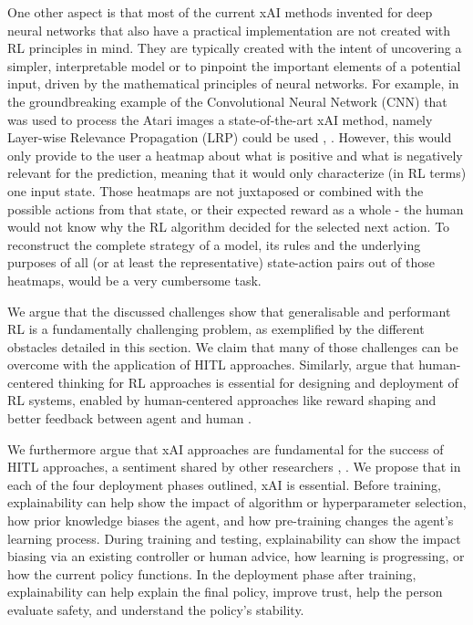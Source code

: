 \documentclass[twoside,11pt]{article}
\begin{document}
One other aspect is that most of the current xAI methods invented for deep neural networks that also have a practical implementation are not created with RL principles in mind. They are typically created with the intent of uncovering a simpler, interpretable model or to pinpoint the important elements of a potential input, driven by the mathematical principles of neural networks. For example, in the groundbreaking example of the Convolutional Neural Network (CNN) that was used to process the Atari images \cite{Mnih:2013:PlayingAtariDeepRL} a state-of-the-art xAI method, namely Layer-wise Relevance Propagation (LRP) could be used \cite{Bach:2015:LayerWiseRelevancePropagation}, \cite{Alber:2019:Innvestigate}. However, this would only provide to the user a heatmap about what is positive and what is negatively relevant for the prediction, meaning that it would only characterize (in RL terms) one input state. Those heatmaps are not juxtaposed or combined with the possible actions from that state, or their expected reward as a whole - the human would not know why the RL algorithm decided for the selected next action. To reconstruct the complete strategy of a model, its rules and the underlying purposes of all (or at least the representative) state-action pairs out of those heatmaps, would be a very cumbersome task. 

We argue that the discussed challenges show that generalisable and performant RL is a fundamentally challenging problem, as exemplified by the different obstacles detailed in this section. We claim that many of those challenges can be overcome with the application of HITL approaches. Similarly, \citep{MatthewsonPilarski:2022:DesigningAndEvaluatingHCIML} argue that human-centered thinking for RL approaches is essential for designing and deployment of RL systems, enabled by human-centered approaches like reward shaping and better feedback between agent and human \citep{Li:2019:HumanCenteredRLSurvey}. 

We furthermore argue that xAI approaches are fundamental for the success of HITL approaches, a sentiment shared by other researchers \citep{heuillet2021explainability}, \citep{milani2022survey}. We propose that in each of the four deployment phases outlined, xAI is essential. Before training, explainability can help show the impact of algorithm or hyperparameter selection, how prior knowledge biases the agent, and how pre-training changes the agent's learning process. During training and testing, explainability can show the impact biasing via an existing controller or human advice, how learning is progressing, or how the current policy functions. In the deployment phase after training, explainability can help explain the final policy, improve trust, help the person evaluate safety, and understand the policy's stability. 
\end{document}
